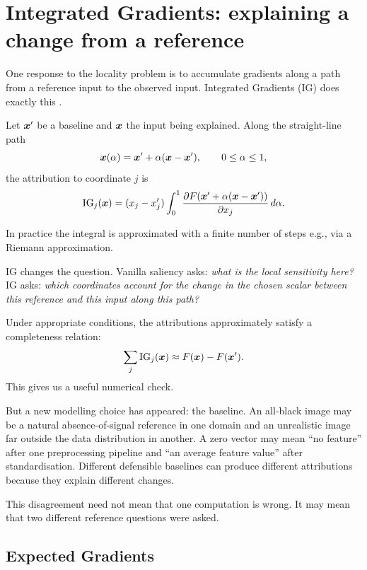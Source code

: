 \section{Integrated Gradients: explaining a change from a reference}

One response to the locality problem is to accumulate gradients along a path from a reference input to the observed input. Integrated Gradients (IG) does exactly this \parencite{sundararajan2017}.

Let \(\bm{x}'\) be a baseline and \(\bm{x}\) the input being explained. Along the straight-line path
\[
  \bm{x}(\alpha)=\bm{x}'+\alpha(\bm{x}-\bm{x}'),
  \qquad 0\le\alpha\le1,
\]
the attribution to coordinate \(j\) is
\begin{equation}
  \mathrm{IG}_j(\bm{x})
  = (x_j-x'_j)
    \int_0^1
    \frac{\partial F\!\left(\bm{x}'+\alpha(\bm{x}-\bm{x}')\right)}{\partial x_j}
    \,d\alpha.
  \label{eq:week6-ig}
\end{equation}

In practice the integral is approximated with a finite number of steps e.g., via a Riemann approximation.

IG changes the question. Vanilla saliency asks: \emph{what is the local sensitivity here?} IG asks: \emph{which coordinates account for the change in the chosen scalar between this reference and this input along this path?}

Under appropriate conditions, the attributions approximately satisfy a completeness relation:
\[
  \sum_j \mathrm{IG}_j(\bm{x})
  \approx F(\bm{x})-F(\bm{x}').
\]
This gives us a useful numerical check.

But a new modelling choice has appeared: the baseline. An all-black image may be a natural absence-of-signal reference in one domain and an unrealistic image far outside the data distribution in another. A zero vector may mean ``no feature'' after one preprocessing pipeline and ``an average feature value'' after standardisation. Different defensible baselines can produce different attributions because they explain different changes.

This disagreement need not mean that one computation is wrong. It may mean that two different reference questions were asked.

\subsection{Expected Gradients}

